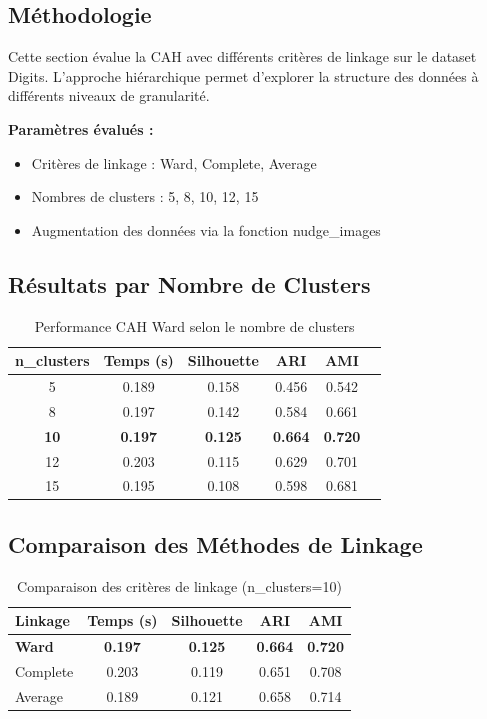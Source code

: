 \documentclass[12pt,a4paper]{article}
\begin{document}
\subsection{Méthodologie}

Cette section évalue la CAH avec différents critères de linkage sur le dataset Digits. L'approche hiérarchique permet d'explorer la structure des données à différents niveaux de granularité.

\textbf{Paramètres évalués :}
\begin{itemize}
    \item Critères de linkage : Ward, Complete, Average
    \item Nombres de clusters : 5, 8, 10, 12, 15
    \item Augmentation des données via la fonction nudge\_images
\end{itemize}

\subsection{Résultats par Nombre de Clusters}

\begin{table}[H]
\centering
\begin{tabular}{cccccc}
\toprule
\textbf{n\_clusters} & \textbf{Temps (s)} & \textbf{Silhouette} & \textbf{ARI} & \textbf{AMI} \\
\midrule
5 & 0.189 & 0.158 & 0.456 & 0.542 \\
8 & 0.197 & 0.142 & 0.584 & 0.661 \\
\textbf{10} & \textbf{0.197} & \textbf{0.125} & \textbf{0.664} & \textbf{0.720} \\
12 & 0.203 & 0.115 & 0.629 & 0.701 \\
15 & 0.195 & 0.108 & 0.598 & 0.681 \\
\bottomrule
\end{tabular}
\caption{Performance CAH Ward selon le nombre de clusters}
\label{tab:cah_clusters}
\end{table}

\subsection{Comparaison des Méthodes de Linkage}

\begin{table}[H]
\centering
\begin{tabular}{lcccc}
\toprule
\textbf{Linkage} & \textbf{Temps (s)} & \textbf{Silhouette} & \textbf{ARI} & \textbf{AMI} \\
\midrule
\textbf{Ward} & \textbf{0.197} & \textbf{0.125} & \textbf{0.664} & \textbf{0.720} \\
Complete & 0.203 & 0.119 & 0.651 & 0.708 \\
Average & 0.189 & 0.121 & 0.658 & 0.714 \\
\bottomrule
\end{tabular}
\caption{Comparaison des critères de linkage (n\_clusters=10)}
\label{tab:linkage_comparison}
\end{table}
\end{document}
